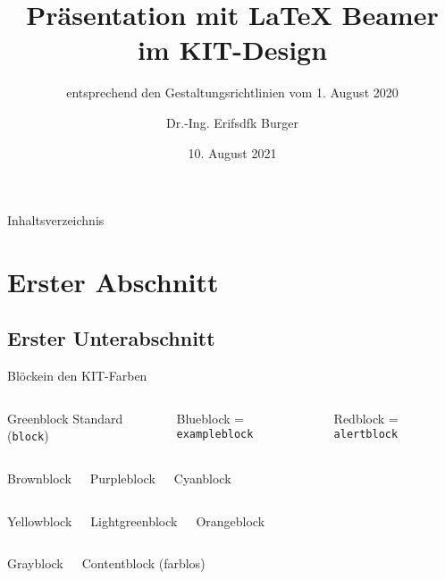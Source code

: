 \documentclass{sdqbeamer}
\title[KIT-Beamer-Vorlage]{Präsentation mit \LaTeX{} Beamer im KIT-Design}
\subtitle{entsprechend den Gestaltungsrichtlinien vom 1. August 2020}
\author[Erik Burger]{Dr.-Ing. Erifsdfk Burger}
\date[10.\,8.\,2021]{10. August 2021}
\begin{document}
 
\KITtitleframe

\begin{frame}{Inhaltsverzeichnis}
\tableofcontents
\end{frame}

\section{Erster Abschnitt}

\subsection{Erster Unterabschnitt}
\begin{frame}{Blöcke}{in den KIT-Farben}
	\begin{columns}
		\begin{greenblock}{Greenblock}
			Standard (\texttt{block})
        \end{greenblock}
		\begin{blueblock}{Blueblock}
			= \texttt{exampleblock}
        \end{blueblock}
		\begin{redblock}{Redblock}
			= \texttt{alertblock}
        \end{redblock}
	\end{columns}
	\begin{columns}
		\column{.3\textwidth}
        \begin{brownblock}{Brownblock}
        \end{brownblock}
		\column{.3\textwidth}
        \begin{purpleblock}{Purpleblock}
        \end{purpleblock}
		\column{.3\textwidth}
        \begin{cyanblock}{Cyanblock}
        \end{cyanblock}
	\end{columns}
	\begin{columns}
        \begin{yellowblock}{Yellowblock}
        \end{yellowblock}
        \begin{lightgreenblock}{Lightgreenblock}
        \end{lightgreenblock}
        \begin{orangeblock}{Orangeblock}
        \end{orangeblock}
	\end{columns}
	\begin{columns}
		\column{.3\textwidth}
        \begin{grayblock}{Grayblock}
        \end{grayblock}
		\column{.3\textwidth}
		\begin{contentblock}{Contentblock}
			(farblos)
		\end{contentblock}
		\column{.3\textwidth}
	\end{columns}
\end{frame}
	  
\end{document}
